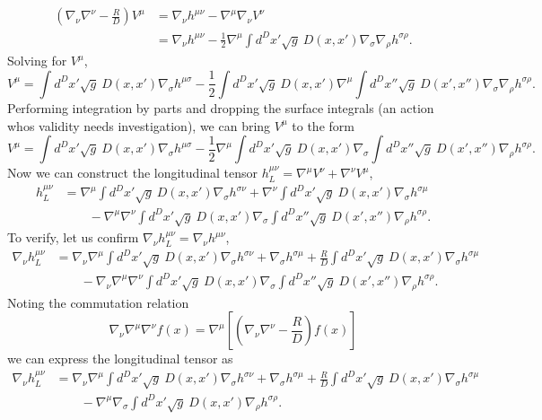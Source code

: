 \documentclass[10pt,letterpaper]{article}
\begin{document}
\begin{align}
\left(\nabla_\nu\nabla^\nu - \frac{R}{D}\right)V^\mu&= \nabla_\nu h^{\mu\nu} -\nabla^\mu \nabla_\nu V^\nu 
\nonumber\\
&=  \nabla_\nu h^{\mu\nu} - \frac12 \nabla^\mu  \int d^Dx' \sqrt{g}\ D(x,x') \nabla_\sigma\nabla_\rho h^{\sigma\rho}.
\end{align}
Solving for $V^\mu$,
\begin{equation}
V^{\mu} =   \int d^Dx' \sqrt{g}\ D(x,x') \nabla_\sigma h^{\mu\sigma} - \frac12
  \int d^Dx' \sqrt{g}\ D(x,x')\nabla^\mu   \int d^Dx'' \sqrt{g}\ D(x',x'') \nabla_\sigma\nabla_\rho h^{\sigma\rho}.
\end{equation}
Performing integration by parts and dropping the surface integrals (an action whos validity needs investigation), we can bring $V^\mu$ to the form
\begin{equation}
V^{\mu} =   \int d^Dx' \sqrt{g}\ D(x,x') \nabla_\sigma h^{\mu\sigma} - \frac12\nabla^\mu 
  \int d^Dx' \sqrt{g}\ D(x,x')\nabla_\sigma   \int d^Dx'' \sqrt{g}\ D(x',x'') \nabla_\rho h^{\sigma\rho}.
\end{equation}
Now we can construct the longitudinal tensor $h^{\mu\nu}_L = \nabla^\mu V^\nu + \nabla^\nu V^\mu$, 
\begin{align}
  h^{\mu\nu}_L&=\nabla^\mu \int d^Dx' \sqrt{g}\ D(x,x')\nabla_\sigma h^{\sigma\nu} + \nabla^\nu \int d^Dx' \sqrt{g}\  D(x,x')\nabla_\sigma h^{\sigma\mu} 
\\
&\qquad -  
 \nabla^\mu\nabla^\nu \int d^Dx'\sqrt{g}\  D(x,x') \nabla_\sigma \int d^Dx'' \sqrt{g}\ D(x',x'')\nabla_\rho h^{\sigma\rho}.
\end{align}
To verify, let us confirm $\nabla_\nu h^{\mu\nu}_L = \nabla_\nu h^{\mu\nu}$,
\begin{align}
\nabla_\nu h^{\mu\nu}_L &= \nabla_\nu \nabla^\mu \int d^Dx' \sqrt{g}\ D(x,x')\nabla_\sigma h^{\sigma\nu}
+ \nabla_\sigma h^{\sigma\mu} + \frac{R}{D}  \int d^Dx' \sqrt{g}\  D(x,x')\nabla_\sigma h^{\sigma\mu} 
\\
&\qquad - \nabla_\nu \nabla^\mu \nabla^\nu \int d^Dx'\sqrt{g}\  D(x,x') \nabla_\sigma \int d^Dx'' \sqrt{g}\ D(x',x'')\nabla_\rho h^{\sigma\rho}.
\end{align}
Noting the commutation relation
\begin{equation}
\nabla_\nu \nabla^\mu \nabla^\nu f(x) = \nabla^\mu\left[\left( \nabla_\nu \nabla^\nu - \frac{R}{D}\right)f(x)\right]
\end{equation}
we can express the longitudinal tensor as
\begin{align}
\nabla_\nu h^{\mu\nu}_L &= \nabla_\nu \nabla^\mu \int d^Dx' \sqrt{g}\ D(x,x')\nabla_\sigma h^{\sigma\nu}
+ \nabla_\sigma h^{\sigma\mu} + \frac{R}{D}  \int d^Dx' \sqrt{g}\  D(x,x')\nabla_\sigma h^{\sigma\mu} 
\nonumber
\\ &\qquad 
- \nabla^\mu \nabla_\sigma \int d^Dx' \sqrt{g}\ D(x,x')\nabla_\rho h^{\sigma\rho}.
\end{align}
\end{document}
